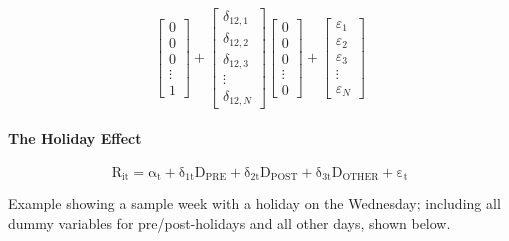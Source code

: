 \documentclass[11pt, english]{article}
\begin{document}
$${                \begin{bmatrix}
                        0\\
                        0\\
                        0\\
                        \vdots\\
			1
		\end{bmatrix}+
                \begin{bmatrix}
                        \delta_{12,1}\\
                        \delta_{12,2}\\
                        \delta_{12,3}\\
                        \vdots\\
                        \delta_{12,N}
                \end{bmatrix}
                \begin{bmatrix}
                        0\\   
                        0\\
                        0\\
                        \vdots\\
                        0
                \end{bmatrix}+
                \begin{bmatrix}
                        \varepsilon_1\\
                        \varepsilon_2\\
                        \varepsilon_3\\
                        \vdots\\
                        \varepsilon_N
                \end{bmatrix}
                }$$
	
	\newpage

		\paragraph{The Holiday Effect}

		$$\mathrm{R_{it}=\alpha_t+\delta_{1t}D_{PRE}+\delta_{2t}D_{POST}+\delta_{3t}D_{OTHER}+\varepsilon_t}$$

		Example showing a sample week with a holiday on the Wednesday; including all dummy variables for pre/post-holidays and all other days, shown below.
\end{document}
